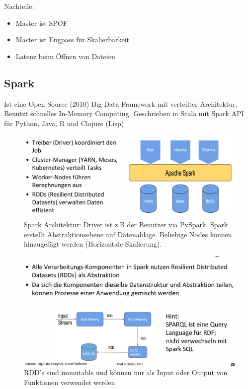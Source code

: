 \documentclass[../Main.tex]{subfiles}
\begin{document}
Nachteile:
\begin{itemize}
    \item Master ist SPOF
    \item Master ist Engpass für Skalierbarkeit
    \item Latenz beim Öffnen von Dateien
\end{itemize}

\subsection{Spark}
Ist eine Open-Source (2010) Big-Data-Framework mit verteilter Architektur.
Benutzt schnelles In-Memory Computing.
Geschrieben in Scala mit Spark API für Python, Java, R und Clojure (Lisp)

\begin{figure}[H]
    \centering
    \includegraphics[width=1\linewidth]{Images/spark-architektur.png}
    \caption{Spark Architektur: Driver ist z.B der Benutzer via PySpark.
    Spark erstellt Abstraktionsebene auf Datenablage. 
    Beliebige Nodes können hinzugefügt werden (Horizontale Skalierung).}
\end{figure}
\begin{figure}[H]
    \centering
    \includegraphics[width=1\linewidth]{Images/RDD.png}
    \caption{RDD's sind immutable und können nur als Input oder Output von Funktionen verwendet werden}
\end{figure}
\end{document}
